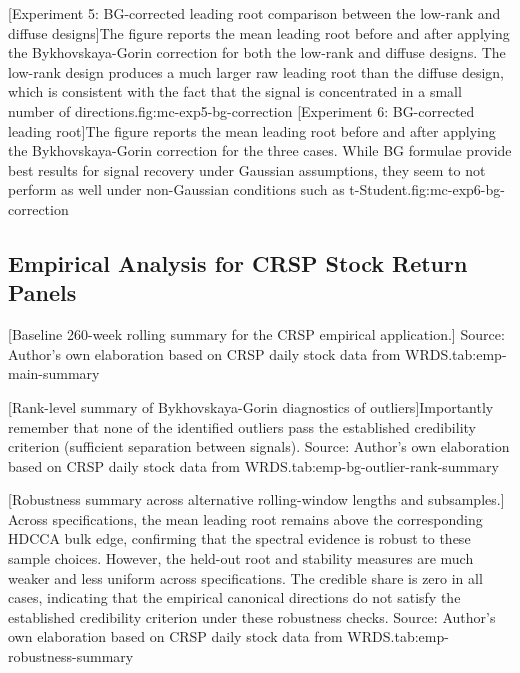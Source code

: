 \documentclass[12pt]{report} %
\newcommand{\setresultnumbering}[1]{%
    \renewcommand{\thefigure}{#1.\arabic{figure}}%
    \renewcommand{\thetable}{#1.\arabic{table}}%
}
\newcommand{\resetresultnumbering}[1]{%
    \setcounter{figure}{0}%
    \setcounter{table}{0}%
    \setresultnumbering{#1}%
}
\begin{document}
[Experiment 5: BG-corrected leading root comparison
between the low-rank and diffuse designs]{The figure reports the mean leading root before 
and after applying the Bykhovskaya-Gorin correction for both the low-rank and diffuse 
designs. The low-rank design produces a much larger raw leading root than the diffuse 
design, which is consistent with the fact that the signal is concentrated in a small 
number of directions.}{fig:mc-exp5-bg-correction}
[Experiment 6: BG-corrected leading root]{The figure reports 
the mean leading root before and after applying the Bykhovskaya-Gorin correction for the three cases. 
While BG formulae provide best results for signal recovery under Gaussian assumptions, they seem to 
not perform as well under non-Gaussian conditions such as t-Student.}{fig:mc-exp6-bg-correction}
\FloatBarrier

\clearpage

\resetresultnumbering{5}
\subsection*{Empirical Analysis for CRSP Stock Return Panels}

[Baseline 260-week rolling summary for the CRSP empirical application.]{
Source: Author's own elaboration based on CRSP daily stock data from WRDS.}{tab:emp-main-summary}

[Rank-level summary of Bykhovskaya-Gorin diagnostics of outliers]{Importantly remember that none of the identified outliers pass the established credibility criterion (sufficient separation between signals). Source: Author's own elaboration based on CRSP daily stock data from WRDS.}{tab:emp-bg-outlier-rank-summary}

[Robustness summary across alternative rolling-window lengths and subsamples.]{
Across specifications, the mean leading root remains above the corresponding HDCCA bulk edge, confirming that 
the spectral evidence is robust to these sample choices. However, the held-out root and stability measures 
are much weaker and less uniform across specifications. 
The credible share is zero in all cases, indicating that the empirical canonical directions do not satisfy 
the established credibility criterion under these robustness checks. Source: Author's own elaboration based on CRSP daily stock data from WRDS.}{tab:emp-robustness-summary}
\FloatBarrier
\end{document}
